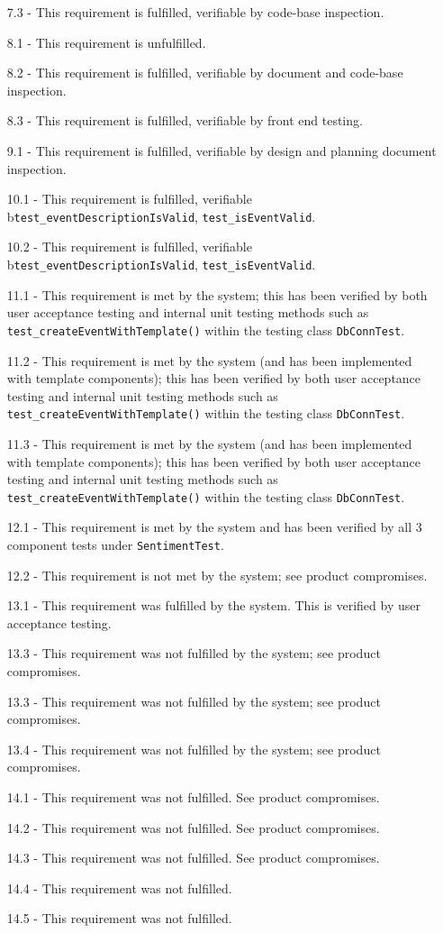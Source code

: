 \documentclass[9pt, titlepage]{extarticle}
\begin{document}
\begin{enumerate}[noitemsep, topsep=0pt, leftmargin=9mm]
 \item[7.3 -] This requirement is fulfilled, verifiable by code-base inspection.
 \item[8.1 -] This requirement is unfulfilled. 
 \item[8.2 -] This requirement is fulfilled, verifiable by document and code-base inspection. 
 \item[8.3 -] This requirement is fulfilled, verifiable by front end testing. 
\item[9.1 -] This requirement is fulfilled, verifiable by design and planning document inspection.
\item[10.1 -] This requirement is fulfilled, verifiable b\texttt{test\_eventDescriptionIsValid}, \texttt{test\_isEventValid}. 
\item[10.2 -] This requirement is fulfilled, verifiable b\texttt{test\_eventDescriptionIsValid}, \texttt{test\_isEventValid}. 
\item[11.1 -] This requirement is met by the system; this has been verified by both user acceptance testing and internal unit testing methods such as \texttt{test\_createEventWithTemplate()} within the testing class \texttt{DbConnTest}.
\item[11.2 -] This requirement is met by the system (and has been implemented with template components); this has been verified by both user acceptance testing and internal unit testing methods such as \texttt{test\_createEventWithTemplate()} within the testing class \texttt{DbConnTest}.
\item[11.3 -] This requirement is met by the system (and has been implemented with template components); this has been verified by both user acceptance testing and internal unit testing methods such as \texttt{test\_createEventWithTemplate()} within the testing class \texttt{DbConnTest}.
\item[12.1 -] This requirement is met by the system and has been verified by all 3 component tests under \texttt{SentimentTest}.
\item[12.2 -] This requirement is not met by the system; see product compromises.
\item[13.1 -] This requirement was fulfilled by the system. This is verified by user acceptance testing. 
\item[13.3 -] This requirement was not fulfilled by the system; see product compromises.
\item[13.3 -] This requirement was not fulfilled by the system; see product compromises.
\item[13.4 -] This requirement was not fulfilled by the system; see product compromises.
\item[14.1 -] This requirement was not fulfilled. See product compromises.
\item[14.2 -] This requirement was not fulfilled. See product compromises.
\item[14.3 -] This requirement was not fulfilled. See product compromises.
\item[14.4 -] This requirement was not fulfilled.
\item[14.5 -] This requirement was not fulfilled.
\end{enumerate}
\end{document}

